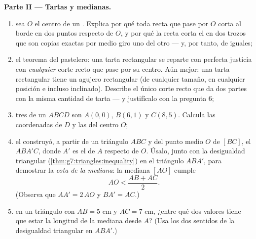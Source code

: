 \begin{problem}
\medskip
\noindent\textbf{Parte II --- Tartas y medianas.}
\begin{enumerate}[resume]
  \item sea $O$ el centro de un . Explica por qué
        toda recta que pase por $O$ corta al borde en dos puntos
         respecto de $O$, y por qué la recta corta el
         en dos trozos que son copias exactas por medio giro
        uno del otro --- y, por tanto, de  iguales;
  \item el teorema del pastelero: una tarta rectangular se reparte
        con perfecta justicia con \emph{cualquier} corte recto que pase por su
        centro. Aún mejor: una tarta rectangular tiene un agujero rectangular
        (de cualquier tamaño, en cualquier posición e incluso inclinado). Describe el
        único corte recto que da dos partes con la misma cantidad
        de tarta --- y justifícalo con la pregunta 6;
  \item tres  de un  $ABCD$ son $A(0, 0)$,
        $B(6, 1)$ y $C(8, 5)$. Calcula las coordenadas de $D$
        y las del centro $O$;
  \item el  construyó, a partir de un triángulo $ABC$
        y del punto medio $O$ de $[BC]$, el 
        $ABA'C$, donde $A'$ es el  de $A$ respecto de $O$.
        Úsalo, junto con la desigualdad triangular
        (\cref{thm:g7:triangles:inequality}) en el triángulo
        $ABA'$, para demostrar la \emph{cota de la mediana}: la mediana
        $[AO]$ cumple
        \[
        AO < \frac{AB + AC}{2} .
        \]
        (Observa que $AA' = 2\,AO$ y $BA' = AC$.)
  \item en un triángulo con $AB = 5$ cm y $AC = 7$ cm, ¿entre
        qué dos valores tiene que estar la longitud de la mediana desde $A$?
        (Usa los dos sentidos de la desigualdad triangular en
        $ABA'$.)
\end{enumerate}


\end{problem}
